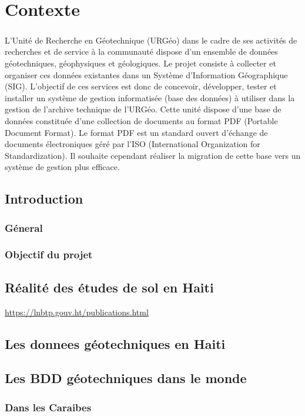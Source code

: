 \chapter{Contexte}
\paragraph{}
L’Unité de Recherche en Géotechnique (URGéo) dans le cadre de ses activités de recherches et de service à
la communauté dispose d’un ensemble de données géotechniques, géophysiques et géologiques. Le projet
consiste à collecter et organiser ces données existantes dans un Système d’Information Géographique (SIG).
L’objectif de ces services est donc de concevoir, développer, tester et installer un système de gestion
informatisée (base des données) à utiliser dans la gestion de l’archive technique de l’URGéo. Cette unité
dispose d'une base de données constituée d’une collection de documents au format PDF (Portable Document
Format). Le format PDF est un standard ouvert d'échange de documents électroniques géré par l’ISO
(International Organization for Standardization). Il souhaite cependant réaliser la migration de cette base vers
un système de gestion plus efficace.
    \section{Introduction}
        \subsection{Géneral}
        \lipsum[1]
        \subsection{Objectif du projet}
        \lipsum[1]
    \section{Réalité des études de sol en Haiti}
    \url{https://lnbtp.gouv.ht/publications.html}
    \lipsum[1]
    \section{Les donnees géotechniques en Haiti}
    \lipsum[1]
    \section{Les BDD géotechniques dans le monde}
        \subsection{Dans les Caraibes}
        \lipsum[1]
